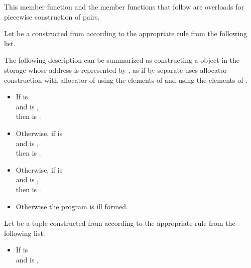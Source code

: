 \begin{itemdescr}
\pnum
\begin{note}
This member function and the  member functions that follow
are overloads for piecewise construction of pairs.
\end{note}

\pnum
\effects
Let  be a  constructed from 
according to the appropriate rule from the following list.
\begin{note}
The following description can be summarized as
constructing a  object
in the storage whose address is represented by ,
as if by separate uses-allocator construction
with allocator 
of  using the elements of 
and  using the elements of .
\end{note}
\begin{itemize}
\item
If  is 
\\
and
 is ,
\\
then  is .
\item
Otherwise, if  is 
\\
and
 is ,
\\
then  is .
\item
Otherwise, if  is 
\\
and
 is ,
\\
then  is .
\item
Otherwise the program is ill formed.
\end{itemize}
Let  be a tuple constructed from 
according to the appropriate rule from the following list:
\begin{itemize}
\item
If  is 
\\
and
 is ,

\end{itemize}
\end{itemdescr}
